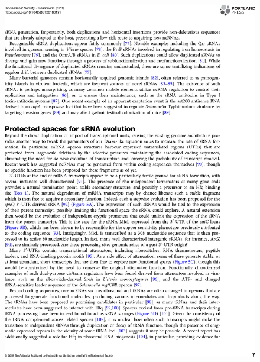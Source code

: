 \begin{figure}
    \centering
    \includegraphics[width=\linewidth]{lit_review/page7.png}
\end{figure}
